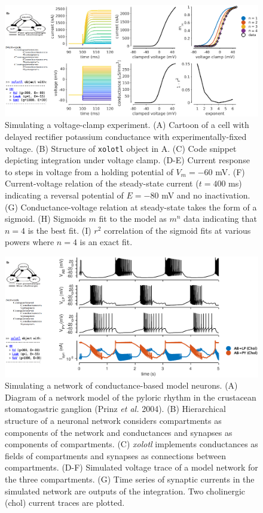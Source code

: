 \documentclass{frontiersSCNS} %
\begin{document}
\begin{figure}
	\centering
	\includegraphics[width=1.0\linewidth]{gfx/figure_clamp}
	\caption{Simulating a voltage-clamp experiment. (A) Cartoon of a cell with delayed rectifier potassium conductance \autocite{liuModelNeuronActivitydependent1998} with experimentally-fixed voltage. (B) Structure of \texttt{xolotl} object in A. (C) Code snippet depicting integration under voltage clamp. (D-E) Current response to steps in voltage from a holding potential of $V_m = -60$ mV. (F) Current-voltage relation of the steady-state current ($t = 400$ ms) indicating a reversal potential of $E = -80$ mV and no inactivation. (G) Conductance-voltage relation at steady-state takes the form of a sigmoid. (H) Sigmoids $m$ fit to the model as $m^n$ data indicating that $n=4$ is the best fit. (I) $r^2$ correlation of the sigmoid fits at various powers where $n=4$ is an exact fit.}
	\label{fig:figureclamp}
\end{figure}

\begin{figure}
	\centering
	\includegraphics[width=1.0\linewidth]{gfx/figure_network}
	\caption{Simulating a network of conductance-based model neurons. (A) Diagram of a network model of the pyloric rhythm in the crustacean stomatogastric ganglion (Prinz \textit{et al.} 2004). (B) Hierarchical structure of a neuronal network considers compartments as components of the network and conductances and synapses as components of compartments. (C) \textit{xolotl} implements conductances as fields of compartments and synapses as connections between compartments. (D-F) Simulated voltage trace of a model network for the three compartments. (G) Time series of synaptic currents in the simulated network are outputs of the integration. Two cholinergic (chol) current traces are plotted.}
	\label{fig:figurenetwork}
\end{figure}
\end{document}
